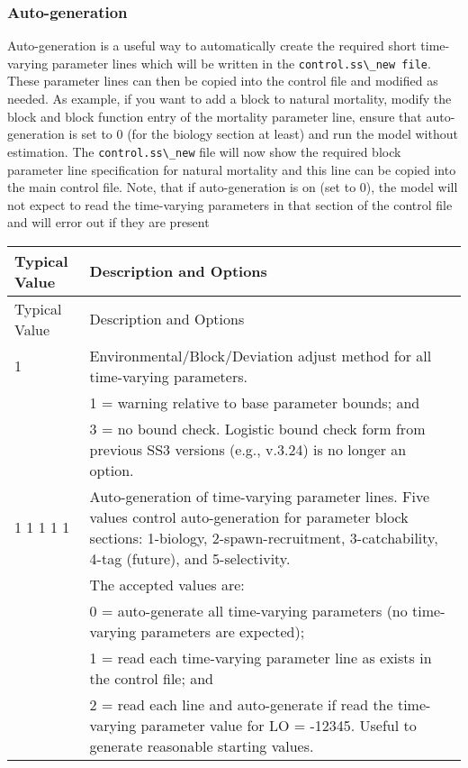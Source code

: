 \hypertarget{autogen}{}
\subsubsection{Auto-generation}
Auto-generation is a useful way to automatically create the required short time-varying parameter lines which will be written in the \verb|control.ss\_new file|. These parameter lines can then be copied into the control file and modified as needed. As example, if you want to add a block to natural mortality, modify the block and block function entry of the mortality parameter line, ensure that auto-generation is set to 0 (for the biology section at least) and run the model without estimation. The \verb|control.ss\_new| file will now show the required block parameter line specification for natural mortality and this line can be copied into the main control file. Note, that if auto-generation is on (set to 0), the model will not expect to read the time-varying parameters in that section of the control file and will error out if they are present

	
\begin{longtable}{p{0.5cm} p{2cm} p{12.5cm}}
	\hline
	\multicolumn{2}{l}{Typical Value} & Description and Options \Tstrut\Bstrut\\
	\hline
	\endfirsthead

	\hline
	\multicolumn{2}{l}{Typical Value} & Description and Options \Tstrut\Bstrut\\
	\hline
	\endhead

	\hline
	\endfoot

	\endlastfoot

	1 & & Environmental/Block/Deviation adjust method for all time-varying parameters. \Tstrut\\
	  & & 1 = warning relative to base parameter bounds; and \\
	  & & 3 = no bound check. Logistic bound check form from previous SS3 versions (e.g., v.3.24) is no longer an option. \Bstrut\\

	\multicolumn{2}{l}{1 1 1 1 1} & Auto-generation of time-varying parameter lines. Five values control auto-generation for parameter block sections: 1-biology, 2-spawn-recruitment, 3-catchability, 4-tag (future), and 5-selectivity. \\
	& 			& The accepted values are: \\
	& 			& 0 = auto-generate all time-varying parameters (no time-varying parameters are expected); \\
	& 			& 1 = read each time-varying parameter line as exists in the control file; and \\
	&			& 2 = read each line and auto-generate if read the time-varying parameter value for LO = -12345. Useful to generate reasonable starting values. \Bstrut\\
	\hline
\end{longtable}


